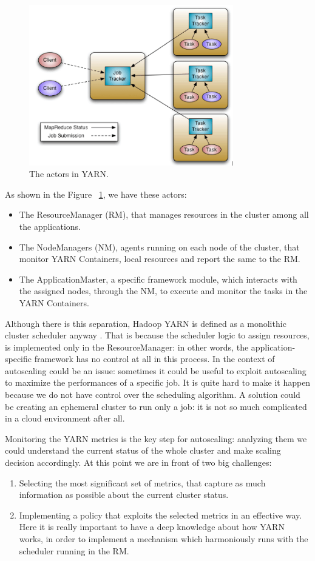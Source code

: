 \documentclass[12pt,twoside,cucitura]{toptesi}
\begin{document}
\begin{figure}
\centering
\includegraphics[height=70mm]{yarn-architecture}
\caption{The actors in YARN.}\label{fig:yarn-architecture}
\end{figure}

As shown in the Figure ~\ref{fig:yarn-architecture}, we have these actors:
\begin{itemize}
  \item The ResourceManager (RM), that manages resources in the cluster among all the applications.
  \item The NodeManagers (NM), agents running on each node of the cluster, that monitor YARN Containers, local resources and report the same to the RM.
  \item The ApplicationMaster, a specific framework module, which interacts with the assigned nodes, through the NM, to execute and monitor the tasks in the YARN Containers.
\end{itemize}

Although there is this separation, Hadoop YARN is defined as a monolithic cluster scheduler anyway \cite{yarn_vs_mesos}. That is because the scheduler logic to assign resources, is implemented only in the ResourceManager: in other words, the application-specific framework has no control at all in this process. In the context of autoscaling could be an issue: sometimes it could be useful to exploit autoscaling to maximize the performances of a specific job. It is quite hard to make it happen because we do not have control over the scheduling algorithm. A solution could be creating an ephemeral cluster to run only a job: it is not so much complicated in a cloud environment after all.

Monitoring the YARN metrics is the key step for autoscaling: analyzing them we could understand the current status of the whole cluster and make scaling decision accordingly. At this point we are in front of two big challenges:
\begin{enumerate}
  \item Selecting the most significant set of metrics, that capture as much information as possible about the current cluster status.
  \item Implementing a policy that exploits the selected metrics in an effective way. Here it is really important to have a deep knowledge about how YARN works, in order to implement a mechanism which harmoniously runs with the scheduler running in the RM.
\end{enumerate}
\end{document}
